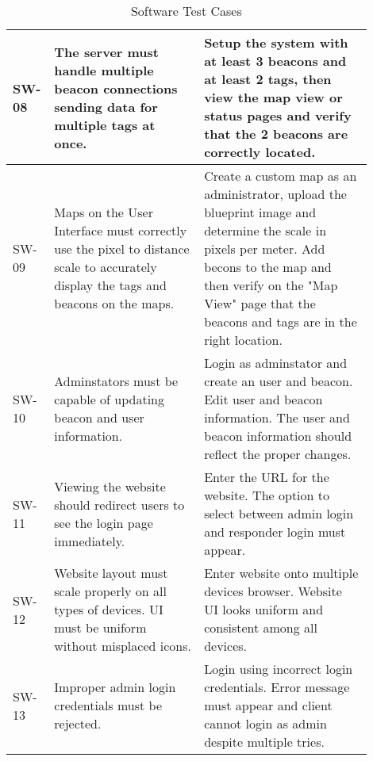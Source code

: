 \bigskip
\bgroup
\def\arraystretch{1.25}
\begin{table}[h!]
    \centering
    \begin{tabular}{|p{0.05\linewidth}|p{0.40\linewidth}|p{0.45\linewidth}|}

    \hline
    SW-08
    & The server must handle multiple beacon connections sending data for multiple tags at once.
    & Setup the system with at least 3 beacons and at least 2 tags, then view the map view or status pages and verify that the 2 beacons are correctly located. \\

    \hline
    SW-09
    & Maps on the User Interface must correctly use the pixel to distance scale to accurately display the tags and beacons on the maps.
    & Create a custom map as an administrator, upload the blueprint image and determine the scale in pixels per meter. Add becons to the map and then verify on the "Map View" page that the beacons and tags are in the right location. \\
    
    \hline
    SW-10
    & Adminstators must be capable of updating beacon and user information. 
    & Login as adminstator and create an user and beacon. Edit user and beacon information. The user and beacon information should reflect the proper changes. \\
    
    \hline
    SW-11
    & Viewing the website should redirect users to see the login page immediately.
    & Enter the URL for the website. The option to select between admin login and responder login must appear. \\

    \hline
    SW-12
    & Website layout must scale properly on all types of devices. UI must be uniform without misplaced icons.
    & Enter website onto multiple devices browser. Website UI looks uniform and consistent among all devices. \\

    \hline
    SW-13
    & Improper admin login credentials must be rejected.
    & Login using incorrect login credentials. Error message must appear and client cannot login as admin despite multiple tries. \\
    
    \hline
    \end{tabular}
    \caption{Software Test Cases}
\end{table}
